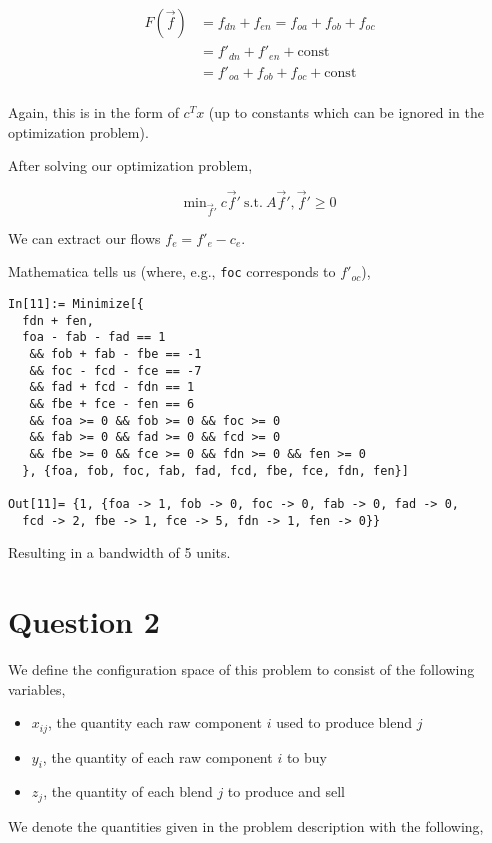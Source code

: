 \documentclass{article}
\begin{document}
\begin{align*}
  F(\vec f) & = f_{dn} + f_{en} = f_{oa} + f_{ob} + f_{oc} \\
            & = f'_{dn} + f'_{en} + \mathrm{const} \\
            & = f'_{oa} + f_{ob} + f_{oc} + \mathrm{const} \\
\end{align*}

Again, this is in the form of $c^T x$ (up to constants which
can be ignored in the optimization problem).

After solving our optimization problem,

\[ \mathrm{min}_{\vec f'} ~ c \vec f' ~ \mathrm{s.t.} ~ A \vec f', \vec f' \ge 0 \]

We can extract our flows $f_e = f'_e - c_e$.

Mathematica tells us (where, e.g., {\tt foc} corresponds to $f'_{oc}$),

\begin{lstlisting}
In[11]:= Minimize[{
  fdn + fen,
  foa - fab - fad == 1
   && fob + fab - fbe == -1
   && foc - fcd - fce == -7
   && fad + fcd - fdn == 1
   && fbe + fce - fen == 6
   && foa >= 0 && fob >= 0 && foc >= 0
   && fab >= 0 && fad >= 0 && fcd >= 0
   && fbe >= 0 && fce >= 0 && fdn >= 0 && fen >= 0
  }, {foa, fob, foc, fab, fad, fcd, fbe, fce, fdn, fen}]

Out[11]= {1, {foa -> 1, fob -> 0, foc -> 0, fab -> 0, fad -> 0, 
  fcd -> 2, fbe -> 1, fce -> 5, fdn -> 1, fen -> 0}}
\end{lstlisting}

Resulting in a bandwidth of 5 units.

\section{Question 2}

We define the configuration space of this problem to consist of the
following variables,

\begin{itemize}
  \item $x_{ij}$, the quantity each raw component $i$ used to produce blend $j$

  \item $y_i$, the quantity of each raw component $i$ to buy

  \item $z_j$, the quantity of each blend $j$ to produce and sell
\end{itemize}
%
We denote the quantities given in the problem description with the following,
\end{document}
